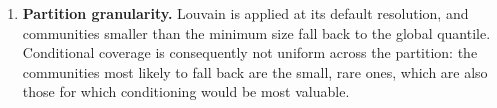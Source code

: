 \begin{enumerate}
\item \textbf{Partition granularity.}
      Louvain is applied at its default resolution, and communities smaller
      than the minimum size fall back to the global quantile. Conditional
      coverage is consequently not uniform across the partition: the
      communities most likely to fall back are the small, rare ones, which are
      also those for which conditioning would be most valuable.
\end{enumerate}
